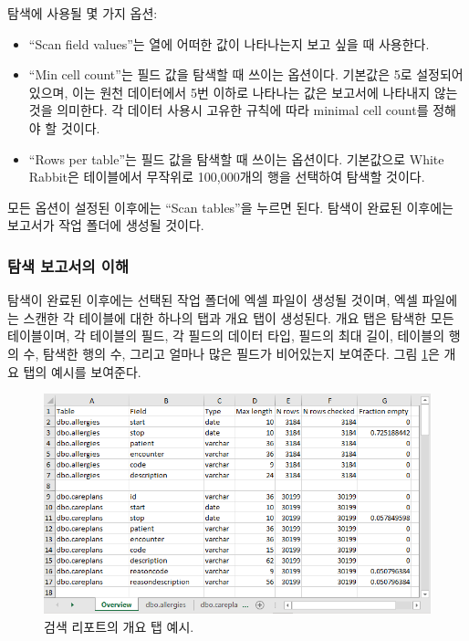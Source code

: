 \documentclass[10.5pt]{book}
\providecommand{\tightlist}{%
  \setlength{\itemsep}{0pt}\setlength{\parskip}{0pt}}
\theoremstyle{definition}
\theoremstyle{definition}
\theoremstyle{definition}
\theoremstyle{remark}
\begin{document}
탐색에 사용될 몇 가지 옵션:

\begin{itemize}
\tightlist
\item
  ``Scan field values''는 열에 어떠한 값이 나타나는지 보고 싶을 때
  사용한다.
\item
  ``Min cell count''는 필드 값을 탐색할 때 쓰이는 옵션이다. 기본값은 5로
  설정되어 있으며, 이는 원천 데이터에서 5번 이하로 나타나는 값은
  보고서에 나타내지 않는 것을 의미한다. 각 데이터 사용시 고유한 규칙에
  따라 minimal cell count를 정해야 할 것이다.
\item
  ``Rows per table''는 필드 값을 탐색할 때 쓰이는 옵션이다. 기본값으로
  White Rabbit은 테이블에서 무작위로 100,000개의 행을 선택하여 탐색할
  것이다.
\end{itemize}

모든 옵션이 설정된 이후에는 ``Scan tables''을 누르면 된다. 탐색이 완료된
이후에는 보고서가 작업 폴더에 생성될 것이다.

\subsubsection*{탐색 보고서의 이해}\label{--}

탐색이 완료된 이후에는 선택된 작업 폴더에 엑셀 파일이 생성될 것이며,
엑셀 파일에는 스캔한 각 테이블에 대한 하나의 탭과 개요 탭이 생성된다.
개요 탭은 탐색한 모든 테이블이며, 각 테이블의 필드, 각 필드의 데이터
타입, 필드의 최대 길이, 테이블의 행의 수, 탐색한 행의 수, 그리고 얼마나
많은 필드가 비어있는지 보여준다. 그림 \ref{fig:ScanOverviewTab}은 개요
탭의 예시를 보여준다.

\begin{figure}

{\centering \includegraphics[width=1\linewidth]{images/ExtractTransformLoad/ScanOverviewTab} 

}

\caption{검색 리포트의 개요 탭 예시.}\label{fig:ScanOverviewTab}
\end{figure}
\end{document}
